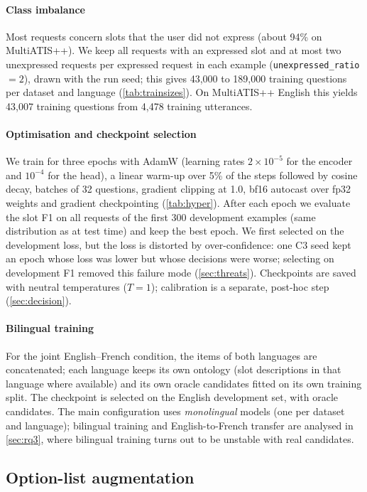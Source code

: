 \paragraph{Class imbalance} Most requests concern slots that the user did not express (about 94\% on MultiATIS++). We keep all requests with an expressed slot and at most two unexpressed requests per expressed request in each example (\texttt{unexpressed\_ratio} $=2$), drawn with the run seed; this gives 43,000 to 189,000 training questions per dataset and language (\cref{tab:trainsizes}). On MultiATIS++ English this yields 43,007 training questions from 4,478 training utterances.

\paragraph{Optimisation and checkpoint selection} We train for three epochs with AdamW (learning rates $2\times10^{-5}$ for the encoder and $10^{-4}$ for the head), a linear warm-up over 5\% of the steps followed by cosine decay, batches of 32 questions, gradient clipping at 1.0, bf16 autocast over fp32 weights and gradient checkpointing (\cref{tab:hyper}). After each epoch we evaluate the slot F1 on all requests of the first 300 development examples (same distribution as at test time) and keep the best epoch. We first selected on the development loss, but the loss is distorted by over-confidence: one C3 seed kept an epoch whose loss was lower but whose decisions were worse; selecting on development F1 removed this failure mode (\cref{sec:threats}). Checkpoints are saved with neutral temperatures ($T=1$); calibration is a separate, post-hoc step (\cref{sec:decision}).

\paragraph{Bilingual training} For the joint English--French condition, the items of both languages are concatenated; each language keeps its own ontology (slot descriptions in that language where available) and its own oracle candidates fitted on its own training split. The checkpoint is selected on the English development set, with oracle candidates. The main configuration uses \emph{monolingual} models (one per dataset and language); bilingual training and English-to-French transfer are analysed in \cref{sec:rq3}, where bilingual training turns out to be unstable with real candidates.

\subsection{Option-list augmentation}
\label{sec:augmentation}

